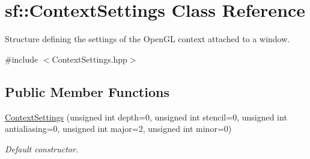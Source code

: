 \hypertarget{structsf_1_1_context_settings}{\section{sf\+:\+:Context\+Settings Class Reference}
\label{structsf_1_1_context_settings}
}


Structure defining the settings of the Open\+G\+L context attached to a window.  




{\ttfamily \#include $<$Context\+Settings.\+hpp$>$}

\subsection*{Public Member Functions}
\begin{DoxyCompactItemize}
\item 
\hyperlink{structsf_1_1_context_settings_aafe35f8e257f9d1e496ed64e33e2ee9f}{Context\+Settings} (unsigned int depth=0, unsigned int stencil=0, unsigned int antialiasing=0, unsigned int major=2, unsigned int minor=0)
\begin{DoxyCompactList}\small\item\em Default constructor. \end{DoxyCompactList}\end{DoxyCompactItemize}
